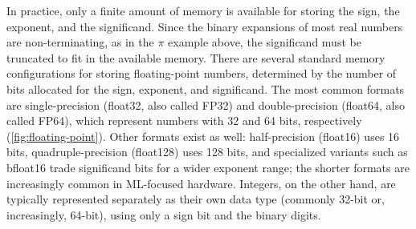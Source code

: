 In practice, only a finite amount of memory is available for storing the sign, the exponent, and the significand.
Since the binary expansions of most real numbers are non-terminating, as in the $\pi$ example above, the significand must be truncated to fit in the available memory.
There are several standard memory configurations for storing floating-point numbers, determined by the number of bits allocated for the sign, exponent, and significand.
The most common formats are single-precision (float32, also called FP32) and double-precision (float64, also called FP64), which represent numbers with 32 and 64 bits, respectively (\autoref{fig:floating-point}).
Other formats exist as well: half-precision (float16) uses 16 bits, quadruple-precision (float128) uses 128 bits, and specialized variants such as bfloat16 trade significand bits for a wider exponent range; the shorter formats are increasingly common in ML-focused hardware.
Integers, on the other hand, are typically represented separately as their own data type (commonly 32-bit or, increasingly, 64-bit), using only a sign bit and the binary digits.
